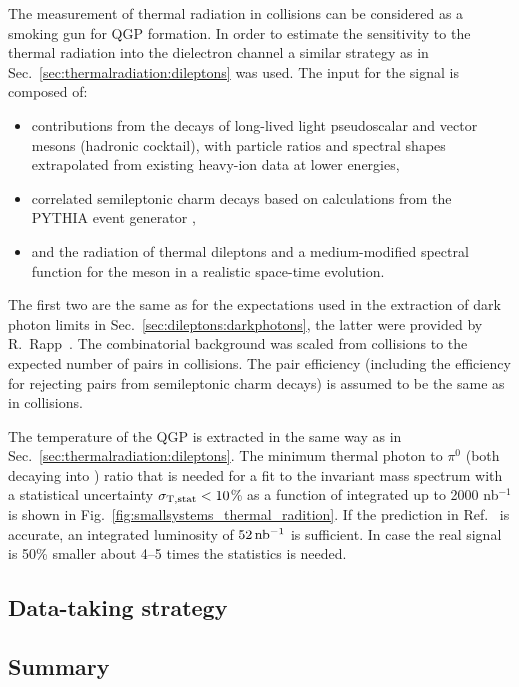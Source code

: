 \documentclass[../report.tex]{subfiles}
\begin{document}
The measurement of thermal radiation in \pPb collisions can be considered as a smoking gun for QGP formation. In order to estimate the sensitivity to the thermal radiation into the dielectron channel a similar strategy as in Sec.~\ref{sec:thermalradiation:dileptons} was used. 
The input for the signal is composed of:
\begin{itemize}
\item contributions from the decays of long-lived light pseudoscalar and vector mesons (hadronic cocktail), with particle ratios and spectral shapes extrapolated from existing heavy-ion data at lower energies,
\item correlated semileptonic charm decays based on calculations from the PYTHIA event generator \cite{Sjostrand:2006za}, 
\item and the radiation of thermal dileptons and a medium-modified spectral function for the \Prho meson in a realistic space-time evolution.
\end{itemize}
The first two are the same as for the expectations used in the extraction of dark photon limits in Sec.~\ref{sec:dileptons:darkphotons}, the latter were provided by R.~Rapp~\cite{RappPriv1}. The combinatorial background was scaled from \PbPb collisions to the expected number of pairs in \pPb collisions. The pair efficiency (including the efficiency for rejecting \Pepem pairs from semileptonic charm decays) is assumed to be the same as in \PbPb collisions. 

The temperature of the QGP is extracted in the same way as in Sec.~\ref{sec:thermalradiation:dileptons}. The minimum thermal photon to $\pi^{0}$ (both decaying into \Pepem) ratio that is needed for a fit to the invariant mass spectrum with a statistical uncertainty $\sigma_{\rm T,stat} < 10$\% as a function of integrated up to 2000 nb$^{-1}$ is shown in Fig.~\ref{fig:smallsystems_thermal_radition}. If the prediction in Ref.~\cite{RappPriv1} is accurate, an integrated luminosity of $\unit[52]{nb^{-1}}$ is sufficient. In case the real signal is 50\% smaller about 4--5 times the statistics is needed.

\subsection{Data-taking strategy}


\subsection{Summary}
\end{document}
